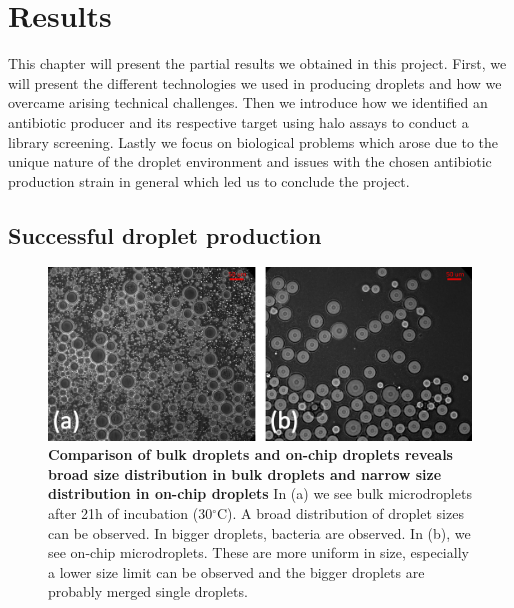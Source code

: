 \chapter{Results}

This chapter will present the partial results we obtained in this project. First, we will present the different technologies we used in producing droplets and how we overcame arising technical challenges. Then we introduce how we identified an antibiotic producer and its respective target using halo assays to conduct a library screening. Lastly we focus on biological problems which arose due to the unique nature of the droplet environment and issues with the chosen antibiotic production strain in general which led us to conclude the project. 

\section{Successful droplet production}
\begin{figure}
\centering
\includegraphics[width=\linewidth]{graphics/2025_09_30_droplets_fig5.png}
\caption{\textbf{Comparison of bulk droplets and on-chip droplets reveals broad size distribution in bulk droplets and narrow size distribution in on-chip droplets} In (a) we see bulk microdroplets after 21h of incubation (30$^\circ$C). A broad distribution of droplet sizes can be observed. In bigger droplets, bacteria are observed. In (b), we see on-chip microdroplets. These are more uniform in size, especially a lower size limit can be observed and the bigger droplets are probably merged single droplets.}
\label{fig:results_droplet_bulk_vs_chip}
\end{figure}
